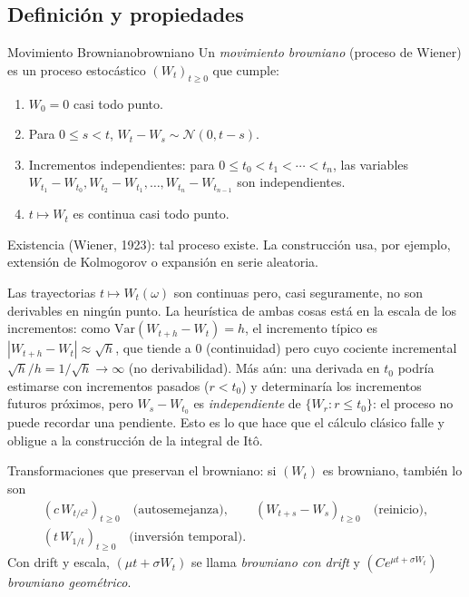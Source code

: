 \documentclass[11pt, a4paper]{article}
\begin{document}
\subsection{Definición y propiedades}

\begin{definicion}{Movimiento Browniano}{browniano}
Un \emph{movimiento browniano} (proceso de Wiener) es un proceso estocástico
$(W_t)_{t \ge 0}$ que cumple:
\begin{enumerate}
    \item $W_0 = 0$ casi todo punto.
    \item Para $0 \le s < t$, $W_t - W_s \sim \mathcal{N}(0, t - s)$.
    \item Incrementos independientes: para $0 \le t_0 < t_1 < \cdots < t_n$, las variables
    $W_{t_1} - W_{t_0}, W_{t_2} - W_{t_1}, \dots, W_{t_n} - W_{t_{n-1}}$ son independientes.
    \item $t \mapsto W_t$ es continua casi todo punto.
\end{enumerate}
\end{definicion}

\obs Existencia (Wiener, 1923): tal proceso existe. La construcción usa, por ejemplo,
extensión de Kolmogorov o expansión en serie aleatoria.

\obs Las trayectorias $t \mapsto W_t(\omega)$ son continuas pero, casi seguramente, no son
derivables en ningún punto. La heurística de ambas cosas está en la escala de los
incrementos: como $\mathrm{Var}(W_{t+h} - W_t) = h$, el incremento típico es
$|W_{t+h} - W_t| \approx \sqrt{h}$, que tiende a $0$ (continuidad) pero cuyo cociente
incremental $\sqrt{h}/h = 1/\sqrt{h} \to \infty$ (no derivabilidad). Más aún: una derivada en
$t_0$ podría estimarse con incrementos pasados ($r < t_0$) y determinaría los incrementos
futuros próximos, pero $W_s - W_{t_0}$ es \emph{independiente} de $\{W_r : r \le t_0\}$: el
proceso no puede recordar una pendiente. Esto es lo que hace que el cálculo clásico falle y
obligue a la construcción de la integral de Itô.

\obs Transformaciones que preservan el browniano: si $(W_t)$ es browniano, también lo son
\begin{gather*}
(c \, W_{t/c^2})_{t \ge 0} \quad \text{(autosemejanza)}, \qquad
(W_{t+s} - W_s)_{t \ge 0} \quad \text{(reinicio)}, \\
(t \, W_{1/t})_{t \ge 0} \quad \text{(inversión temporal)}.
\end{gather*}
Con drift y escala, $(\mu t + \sigma W_t)$ se llama \emph{browniano con drift} y
$(C e^{\mu t + \sigma W_t})$ \emph{browniano geométrico}.
\end{document}
